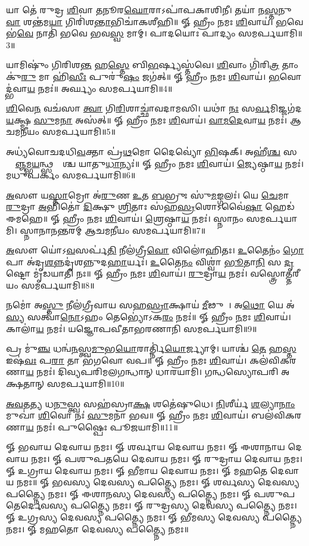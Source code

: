 𑌯𑌾 𑌤𑍇॑ 𑌰𑍁𑌦𑍍𑌰 \ul{𑌶𑌿}𑌵𑌾 \ul{𑌤}𑌨𑍂𑌰\ul{𑌘𑍋}𑌰𑌾𑌽𑌪𑌾॑𑌪𑌕𑌾𑌶𑌿𑌨𑍀। 𑌤𑌯𑌾॑ 𑌨\ul{𑌸𑍍𑌤}𑌨𑍁\ul{𑌵𑌾} 𑌶𑌨𑍍𑌤॑𑌮\ul{𑌯𑌾} 𑌗𑌿𑌰𑌿॑𑌶\ul{𑌨𑍍𑌤𑌾}\-𑌭𑌿𑌚𑌾॑𑌕𑌶𑍀𑌹𑌿॥ 𑍐 𑌹𑍍𑌰𑍀𑌂 \ul{𑌨}𑌮𑌃 \ul{𑌶𑌿}𑌵𑌾𑌯॑। \ul{𑌭}𑌵𑍇 𑌭॑\ul{𑌵𑍇} 𑌨𑌾𑌤𑌿॑ 𑌭𑌵𑍇 𑌭𑌵\ul{𑌸𑍍𑌵} 𑌮𑌾𑌮𑍍। 𑌪𑌾𑌦𑌯𑍋𑌃 𑌪𑌾𑌦𑍍𑌯𑌂 𑌸𑌮𑌰𑍍𑌪𑌯𑌾𑌮𑌿॥3॥

𑌯𑌾𑌮𑌿𑌷𑍁𑌂॑ 𑌗𑌿𑌰𑌿𑌶\ul{𑌨𑍍𑌤} 𑌹\ul{𑌸𑍍𑌤𑍇} 𑌬𑌿\ul{𑌭}𑌰𑍍𑌷𑍍𑌯𑌸𑍍𑌤॑𑌵𑍇। \ul{𑌶𑌿}𑌵𑌾𑌂 𑌗𑌿॑𑌰𑌿\ul{𑌤𑍍𑌰} 𑌤𑌾𑌂 𑌕𑍁॑\ul{𑌰𑍁} 𑌮𑌾 𑌹𑌿॑\ul{𑌸𑍀𑌃} 𑌪𑍁𑌰𑍁॑\ul{𑌷𑌂} 𑌜𑌗॑𑌤𑍍॥ 𑍐 𑌹𑍍𑌰𑍀𑌂 \ul{𑌨}𑌮𑌃 \ul{𑌶𑌿}𑌵𑌾𑌯॑। \ul{𑌭}𑌵𑍋𑌦𑍍𑌭॑𑌵𑌾\ul{𑌯} 𑌨𑌮𑌃॑॥ 𑌅𑌰𑍍𑌘𑍍𑌯𑌂 𑌸𑌮𑌰𑍍𑌪𑌯𑌾𑌮𑌿॥4॥

\ul{𑌶𑌿}𑌵𑍇\ul{𑌨} 𑌵𑌚॑𑌸𑌾 \ul{𑌤𑍍𑌵𑌾} 𑌗𑌿\ul{𑌰𑌿}𑌶𑌾𑌚𑍍𑌛𑌾॑𑌵𑌦𑌾𑌮𑌸𑌿। 𑌯𑌥𑌾॑ \ul{𑌨𑌃} 𑌸\ul{𑌰𑍍𑌵}𑌮𑌿𑌜𑍍𑌜𑌗॑𑌦\ul{𑌯}𑌕𑍍𑌷𑍍𑌮 \ul{𑌸𑍁}𑌮\ul{𑌨𑌾} 𑌅𑌸॑𑌤𑍍॥ 𑍐 𑌹𑍍𑌰𑍀𑌂 \ul{𑌨}𑌮𑌃 \ul{𑌶𑌿}𑌵𑌾𑌯॑। \ul{𑌵𑌾}\ul{𑌮}\ul{𑌦𑍇}𑌵𑌾\ul{𑌯} 𑌨𑌮𑌃॑। 𑌆𑌚𑌮𑌨𑍀𑌯𑌂 𑌸𑌮𑌰𑍍𑌪𑌯𑌾𑌮𑌿॥5॥

𑌅𑌧𑍍𑌯॑𑌵𑍋𑌚𑌦𑌧𑌿\ul{𑌵}𑌕𑍍𑌤𑌾 𑌪𑍍𑌰॑\ul{𑌥}𑌮𑍋 𑌦𑍈𑌵𑍍𑌯𑍋॑ \ul{𑌭𑌿}𑌷𑌕𑍍। 𑌅𑌹𑍀॑\ul{𑌶𑍍𑌚} 𑌸𑌰𑍍𑌵𑌾᳚\ul{𑌞𑍍𑌜}𑌮𑍍𑌭\ul{𑌯}𑌨𑍍𑌥𑍍𑌸𑌰𑍍𑌵𑌾᳚𑌶𑍍𑌚 𑌯𑌾𑌤𑍁\ul{𑌧𑌾}𑌨𑍍𑌯𑌃॑॥ 𑍐 𑌹𑍍𑌰𑍀𑌂 \ul{𑌨}𑌮𑌃 \ul{𑌶𑌿}𑌵𑌾𑌯॑। \ul{𑌜𑍍𑌯𑍇}𑌷𑍍𑌠𑌾\ul{𑌯} 𑌨𑌮𑌃॑। 𑌮𑌧𑍁𑌪𑌰𑍍𑌕𑌂 𑌸𑌮𑌰𑍍𑌪𑌯𑌾𑌮𑌿॥6॥

\ul{𑌅}𑌸𑍗 𑌯\ul{𑌸𑍍𑌤𑌾}𑌮𑍍𑌰𑍋 𑌅॑\ul{𑌰𑍁}𑌣 \ul{𑌉}𑌤 \ul{𑌬}𑌭𑍍𑌰𑍁𑌃 𑌸𑍁॑\ul{𑌮}𑌙𑍍𑌗𑌲𑌃॑। 𑌯𑍇 \ul{𑌚𑍇}𑌮𑌾 \ul{𑌰𑍁}𑌦𑍍𑌰𑌾 \ul{𑌅}𑌭𑌿𑌤𑍋॑ \ul{𑌦𑌿}𑌕𑍍𑌷𑍁 \ul{𑌶𑍍𑌰𑌿}𑌤𑌾𑌃 𑌸॑𑌹\ul{𑌸𑍍𑌰}𑌶𑍋𑌽𑌵𑍈॑\ul{𑌷𑌾}\ul{} 𑌹𑍇𑌡॑ 𑌈𑌮𑌹𑍇॥ 𑍐 𑌹𑍍𑌰𑍀𑌂 \ul{𑌨}𑌮𑌃 \ul{𑌶𑌿}𑌵𑌾𑌯॑। \ul{𑌶𑍍𑌰𑍇}𑌷𑍍𑌠𑌾\ul{𑌯} 𑌨𑌮𑌃॑। 𑌸𑍍𑌨𑌾𑌨𑌂 𑌸𑌮𑌰𑍍𑌪𑌯𑌾𑌮𑌿। 𑌸𑍍𑌨𑌾𑌨𑌾𑌨𑌨𑍍𑌤𑌰𑌮𑍍 𑌆𑌚𑌮𑌨𑍀𑌯𑌂 𑌸𑌮𑌰𑍍𑌪𑌯𑌾𑌮𑌿॥7॥

\ul{𑌅}𑌸𑍗 𑌯𑍋॑𑌽\ul{𑌵}𑌸𑌰𑍍𑌪॑\ul{𑌤𑌿} 𑌨𑍀𑌲॑𑌗𑍍𑌰𑍀\ul{𑌵𑍋} 𑌵𑌿𑌲𑍋॑𑌹𑌿𑌤𑌃। \ul{𑌉}𑌤𑍈𑌨𑌂॑ \ul{𑌗𑍋}𑌪𑌾 𑌅॑𑌦𑍃\ul{𑌶}\ul{𑌨𑍍𑌨}𑌦𑍃॑𑌶𑌨𑍍𑌨𑍁𑌦\ul{𑌹𑌾}𑌰𑍍𑌯𑌃॑। \ul{𑌉}𑌤𑍈\ul{𑌨𑌂} 𑌵𑌿𑌶𑍍𑌵𑌾॑ \ul{𑌭𑍂}𑌤𑌾\ul{𑌨𑌿} 𑌸 \ul{𑌦𑍃}𑌷𑍍𑌟𑍋 𑌮𑍃॑𑌡𑌯𑌾𑌤𑌿 𑌨𑌃॥ 𑍐 𑌹𑍍𑌰𑍀𑌂 \ul{𑌨}𑌮𑌃 \ul{𑌶𑌿}𑌵𑌾𑌯॑। \ul{𑌰𑍁}𑌦𑍍𑌰𑌾\ul{𑌯} 𑌨𑌮𑌃॑। 𑌵𑌸𑍍𑌤𑍍𑌰𑍋𑌤𑍍𑌤𑌰𑍀𑌯𑌂 𑌸𑌮𑌰𑍍𑌪𑌯𑌾𑌮𑌿॥8॥

𑌨𑌮𑍋॑ 𑌅\ul{𑌸𑍍𑌤𑍁} 𑌨𑍀𑌲॑𑌗𑍍𑌰𑍀𑌵𑌾𑌯 𑌸𑌹\ul{𑌸𑍍𑌰𑌾}𑌕𑍍𑌷𑌾𑌯॑ \ul{𑌮𑍀}𑌢𑍁𑌷𑍇᳚। 𑌅\ul{𑌥𑍋} 𑌯𑍇 𑌅॑\ul{𑌸𑍍𑌯} 𑌸𑌤𑍍𑌵𑌾॑\ul{𑌨𑍋}𑌽𑌹𑌂 𑌤𑍇𑌭𑍍𑌯𑍋॑𑌽𑌕\ul{𑌰𑌂} 𑌨𑌮𑌃॑॥ 𑍐 𑌹𑍍𑌰𑍀𑌂 \ul{𑌨}𑌮𑌃 \ul{𑌶𑌿}𑌵𑌾𑌯॑। 𑌕𑌾𑌲𑌾॑\ul{𑌯} 𑌨𑌮𑌃॑। 𑌯𑌜𑍍𑌞𑍋𑌪𑌵𑍀𑌤𑌾𑌭𑌰𑌣𑌾𑌨𑌿 𑌸𑌮𑌰𑍍𑌪𑌯𑌾𑌮𑌿॥9॥

𑌪𑍍𑌰 𑌮𑍁॑\ul{𑌞𑍍𑌚} 𑌧𑌨𑍍𑌵॑\ul{𑌨}𑌸𑍍𑌤𑍍𑌵\ul{𑌮𑍁}𑌭\ul{𑌯𑍋}𑌰𑌾𑌰𑍍𑌤𑍍𑌨𑌿॑\ul{𑌯𑍋}𑌰𑍍𑌜𑍍𑌯𑌾𑌮𑍍। 𑌯𑌾𑌶𑍍𑌚॑ \ul{𑌤𑍇} 𑌹\ul{𑌸𑍍𑌤} 𑌇𑌷॑\ul{𑌵𑌃} 𑌪\ul{𑌰𑌾} 𑌤𑌾 𑌭॑𑌗𑌵𑍋 𑌵𑌪॥ 𑍐 𑌹𑍍𑌰𑍀𑌂 \ul{𑌨}𑌮𑌃 \ul{𑌶𑌿}𑌵𑌾𑌯॑। 𑌕𑌲॑𑌵𑌿𑌕𑌰𑌣𑌾\ul{𑌯} 𑌨𑌮𑌃॑। 𑌦𑌿𑌵𑍍𑌯𑌪𑌰𑌿𑌮𑌲𑌗𑌨𑍍𑌧𑌾𑌨𑍍 𑌧𑌾𑌰𑌯𑌾𑌮𑌿। 𑌗𑌨𑍍𑌧𑌸𑍍𑌯𑍋𑌪𑌰𑌿 𑌅𑌕𑍍𑌷𑌤𑌾𑌨𑍍 𑌸𑌮𑌰𑍍𑌪𑌯𑌾𑌮𑌿॥10॥

\ul{𑌅}\ul{𑌵}𑌤\ul{𑌤𑍍𑌯} 𑌧\ul{𑌨𑍁}𑌸𑍍𑌤𑍍𑌵 𑌸𑌹॑𑌸𑍍𑌰𑌾\ul{𑌕𑍍𑌷} 𑌶𑌤𑍇॑𑌷𑍁𑌧𑍇। \ul{𑌨𑌿}𑌶𑍀𑌰𑍍𑌯॑ \ul{𑌶}𑌲𑍍𑌯𑌾\ul{𑌨𑌾𑌂} 𑌮𑍁𑌖𑌾॑ \ul{𑌶𑌿}𑌵𑍋 𑌨𑌃॑ \ul{𑌸𑍁}𑌮𑌨𑌾॑ 𑌭𑌵॥ 𑍐 𑌹𑍍𑌰𑍀𑌂 \ul{𑌨}𑌮𑌃 \ul{𑌶𑌿}𑌵𑌾𑌯॑। 𑌬𑌲॑𑌵𑌿𑌕𑌰𑌣𑌾\ul{𑌯} 𑌨𑌮𑌃॑। 𑌪𑍁𑌷𑍍𑌪𑍈𑌃 𑌪𑍂𑌜𑌯𑌾𑌮𑌿॥11॥


𑍐 𑌭𑌵𑌾𑌯 𑌦𑍇𑌵𑌾𑌯 𑌨𑌮𑌃। 𑍐 𑌶𑌰𑍍𑌵𑌾𑌯 𑌦𑍇𑌵𑌾𑌯 𑌨𑌮𑌃। 𑍐 𑌈𑌶𑌾𑌨𑌾𑌯 𑌦𑍇𑌵𑌾𑌯 𑌨𑌮𑌃। 𑍐 𑌪𑌶𑍁𑌪𑌤𑌯𑍇 𑌦𑍇𑌵𑌾𑌯 𑌨𑌮𑌃। 𑍐 𑌰𑍁𑌦𑍍𑌰𑌾𑌯 𑌦𑍇𑌵𑌾𑌯 𑌨𑌮𑌃। 𑍐 𑌉𑌗𑍍𑌰𑌾𑌯 𑌦𑍇𑌵𑌾𑌯 𑌨𑌮𑌃। 𑍐 𑌭𑍀𑌮𑌾𑌯 𑌦𑍇𑌵𑌾𑌯 𑌨𑌮𑌃। 𑍐 𑌮𑌹𑌤𑍇 𑌦𑍇𑌵𑌾𑌯 𑌨𑌮𑌃॥
𑍐 𑌭𑌵𑌸𑍍𑌯 𑌦𑍇𑌵𑌸𑍍𑌯 𑌪𑌤𑍍𑌨𑍍𑌯𑍈 𑌨𑌮𑌃। 𑍐 𑌶𑌰𑍍𑌵𑌸𑍍𑌯 𑌦𑍇𑌵𑌸𑍍𑌯 𑌪𑌤𑍍𑌨𑍍𑌯𑍈 𑌨𑌮𑌃। 𑍐 𑌈𑌶𑌾𑌨𑌸𑍍𑌯 𑌦𑍇𑌵𑌸𑍍𑌯 𑌪𑌤𑍍𑌨𑍍𑌯𑍈 𑌨𑌮𑌃। 𑍐 𑌪𑌶𑍁𑌪𑌤𑍇𑌰𑍍𑌦𑍇𑌵𑌸𑍍𑌯 𑌪𑌤𑍍𑌨𑍍𑌯𑍈 𑌨𑌮𑌃। 𑍐 𑌰𑍁𑌦𑍍𑌰𑌸𑍍𑌯 𑌦𑍇𑌵𑌸𑍍𑌯 𑌪𑌤𑍍𑌨𑍍𑌯𑍈 𑌨𑌮𑌃। 𑍐 𑌉𑌗𑍍𑌰𑌸𑍍𑌯 𑌦𑍇𑌵𑌸𑍍𑌯 𑌪𑌤𑍍𑌨𑍍𑌯𑍈 𑌨𑌮𑌃। 𑍐 𑌭𑍀𑌮𑌸𑍍𑌯 𑌦𑍇𑌵𑌸𑍍𑌯 𑌪𑌤𑍍𑌨𑍍𑌯𑍈 𑌨𑌮𑌃। 𑍐 𑌮𑌹𑌤𑍋 𑌦𑍇𑌵𑌸𑍍𑌯 𑌪𑌤𑍍𑌨𑍍𑌯𑍈 𑌨𑌮𑌃॥ 

